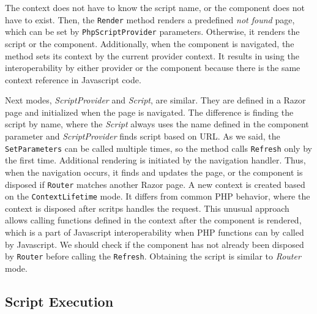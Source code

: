 The context does not have to know the script name, or the component does not have to exist. 
Then, the \texttt{Render} method renders a predefined \textit{not found} page, which can be set by \texttt{PhpScriptProvider} parameters.
Otherwise, it renders the script or the component.
Additionally, when the component is navigated, the method sets its context by the current provider context.
It results in using the interoperability by either provider or the component because there is the same context reference in Javascript code.
\par
Next modes, \textit{ScriptProvider} and \textit{Script}, are similar.
They are defined in a Razor page and initialized when the page is navigated.  
The difference is finding the script by name, where the \textit{Script} always uses the name defined in the component parameter and \textit{ScriptProvider} finds script based on URL.
As we said, the \texttt{SetParameters} can be called multiple times, so the method calls \texttt{Refresh} only by the first time.
Additional rendering is initiated by the navigation handler.
Thus, when the navigation occurs, it finds and updates the page, or the component is disposed if \texttt{Router} matches another Razor page.
A new context is created based on the \texttt{ContextLifetime} mode.
It differs from common PHP behavior, where the context is disposed after scritps handles the request.
This unusual approach allows calling functions defined in the context after the component is rendered, which is a part of Javascript interoperability when PHP functions can by called by Javascript.
We should check if the component has not already been disposed by \texttt{Router} before calling the \texttt{Refresh}.
Obtaining the script is similar to \textit{Router} mode.

\subsection{Script Execution}

